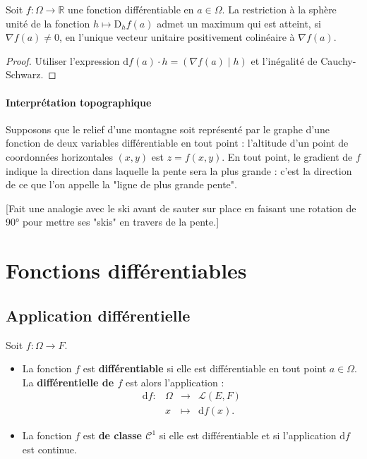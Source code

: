 \documentclass[french]{article}
\newcommand{\R}{\mathbb{R}}
\renewcommand{\d}{\text{d}}
\newcommand{\D}{\text{D}}
\theoremstyle{plain}
\theoremstyle{definition}
\theoremstyle{remark}
\begin{document}
\begin{prop}%
	Soit $f:\Omega\to\R$ une fonction différentiable en $a\in\Omega$. La restriction à la sphère unité de la fonction $h\mapsto \D_hf(a)$ admet un maximum qui est atteint, si $\nabla f(a)\ne0$, en l'unique vecteur unitaire positivement colinéaire à $\nabla f(a)$.
\end{prop}
\begin{proof}
	Utiliser l'expression $\d f(a)\cdot h=(\nabla f(a)\mid h)$ et l'inégalité de Cauchy-Schwarz.
\end{proof}

\paragraph{Interprétation topographique}
Supposons que le relief d'une montagne soit représenté par le graphe d'une fonction de deux variables différentiable en tout point : l'altitude d'un point de coordonnées horizontales $(x,y)$ est $z=f(x,y)$. En tout point, le gradient de $f$ indique la direction dans laquelle la pente sera la plus grande : c'est la direction de ce que l'on appelle la "ligne de plus grande pente".

[Fait une analogie avec le ski avant de sauter sur place en faisant une rotation de 90° pour mettre ses "skis" en travers de la pente.]

\section{Fonctions différentiables}

\subsection{Application différentielle}

\begin{dfn}
	Soit $f:\Omega\to F$.
	\begin{itemize}
		\item La fonction $f$ est \textbf{différentiable} si elle est différentiable en tout point $a\in\Omega$. La \textbf{différentielle de $f$} est alors l'application :
		$$\begin{array}{lrcl}
			\d f:&\Omega&\longrightarrow&\mathcal{L}(E,F)\\
			&x&\longmapsto&\d f(x).
		\end{array}$$
		\item La fonction $f$ est \textbf{de classe $\mathcal{C}^1$} si elle est différentiable et si l'application $\d f$ est continue.
	\end{itemize}
\end{dfn}
\end{document}
